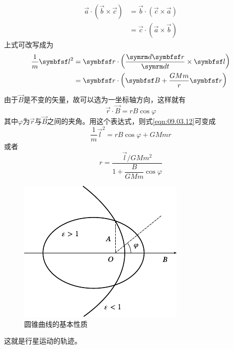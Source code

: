 \begin{equation}\label{eqn:09.03.11}
  \begin{split}
    \vec{a} \cdot \left( \vec{b} \times \vec{c} \right) &= \vec{b} \cdot \left( \vec{c} \times \vec{a} \right) \\
    &= \vec{c} \cdot \left( \vec{a} \times \vec{b} \right)
  \end{split}
\end{equation}
上式可改写成为
\begin{equation}\label{eqn:09.03.12}
  \begin{split}
    \frac { 1 } { m } \vec{l} ^ { 2 } &= \vec{r} \cdot \left( \frac { \dif \vec{r} } { \dif t } \times \vec{l} \right) \\
    &= \vec{r} \cdot \left( \vec{B} + \frac { G M m } { r } \vec{r} \right)
  \end{split}
\end{equation}
由于$\vec{B}$是不变的矢量，故可以选为一坐标轴方向，这样就有
\begin{equation*}
  \vec{r} \cdot \vec{B} = r B \cos \varphi
\end{equation*}
其中$ \varphi $为$ \vec{r} $与$ \vec{B} $之间的夹角。用这个表达式，则式\eqref{eqn:09.03.12}可变成\vspace{-1.2em}
\begin{equation*}
  \frac { 1 } { m } \vec{l} ^ { 2 } = r B \cos \varphi + G M m r
\end{equation*}
或者\vspace{-1.2em}
\begin{equation}\label{eqn:09.03.13}
  r = \frac { \vec{l} / G M m ^ 2 } { 1 + \dfrac { B } { G M m } \cos \varphi }
\end{equation}
\begin{figure}
  \centering
  \includegraphics{figure/fig09.07}
  \caption{圆锥曲线的基本性质}
  \label{fig:09.07}
\end{figure}
这就是行星运动的轨迹。

